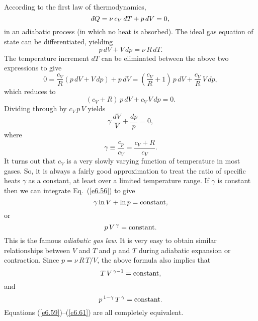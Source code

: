 According to the first law of thermodynamics, 
\begin{equation}
\dbar Q =  \nu \,c_V \,dT +p\,dV = 0,
\end{equation}
in  an adiabatic process (in which no heat is absorbed). The ideal gas
equation
of state can be differentiated, yielding
\begin{equation}
p\,dV + V\,dp = \nu\, R \,dT.
\end{equation}
The temperature increment $dT$ can be eliminated between the above two expressions
to give
\begin{equation}
0 = \frac{c_V}{R} (p\,dV + V\,dp) + p \,dV = \left(\frac{c_V}{R} + 1\right)
\,p\, dV +\frac{c_V}{R} \,V\,dp,
\end{equation}
which reduces to
\begin{equation}
(c_V +R)\,p\,dV + c_V \,V\, dp = 0.
\end{equation}
Dividing through by $c_V\, p\, V$ yields
\begin{equation}
\gamma\,\frac{dV}{V} + \frac{dp}{p}=0,\label{e6.56}
\end{equation}
where
\begin{equation}
\gamma \equiv \frac{c_p}{c_V} = \frac{c_V + R}{c_V}.
\end{equation}
It turns out that $c_V$ is a very slowly varying function of temperature in most
gases. So, it is always a fairly good approximation to treat the ratio
of specific heats $\gamma$ as a constant, at least over a limited temperature
range. If $\gamma$ is constant then we can integrate Eq.~(\ref{e6.56}) to give
\begin{equation}
\gamma \ln V + \ln p = {\rm constant},
\end{equation}
or
\begin{equation}
p \,V^{\,\gamma} = {\rm constant}.\label{e6.59}
\end{equation}
This is the famous {\em adiabatic gas law}. 
It is very easy to obtain similar relationships between $V$ and $T$ and $p$ and $T$
during adiabatic expansion or contraction. Since $p = \nu\, R\,T/V$, the above formula
also implies that
\begin{equation}
T \,V^{\,\gamma-1} = {\rm constant},
\end{equation}
and
\begin{equation}
p^{\,1-\gamma} \,T^{\,\gamma} = {\rm constant}.\label{e6.61}
\end{equation}
Equations (\ref{e6.59})--(\ref{e6.61}) are all completely equivalent.


